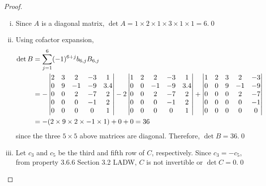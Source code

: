 \begin{proof}
    \renewcommand{\qedsymbol}{$\blacksquare$}

    \begin{enumerate}[(i)]
        \item Since $A$ is a diagonal matrix, $\det A=1\times 2\times 1\times 3\times 1\times 1=6$.\qed
        \item Using cofactor expansion, 
        \[
            \begin{aligned}
                \det B&=\sum_{j=1}^{6}(-1)^{6+j}b_{6,j}B_{6,j}\\
                &=-\begin{vmatrix}
                    2 & 3 & 2 & -3 & 1\\
                    0 & 9 & -1 & -9 & 3.4\\
                    0 & 0 & 2 & -7 & 2\\
                    0 & 0 & 0 & -1 & 2\\
                    0 & 0 & 0 & 0 & 1 
                \end{vmatrix}
                -2\begin{vmatrix}
                    1 & 2 & 2 & -3 & 1\\
                    0 & 0 & -1 & -9 & 3.4\\
                    0 & 0 & 2 & -7 & 2\\
                    0 & 0 & 0 & -1 & 2\\
                    0 & 0 & 0 & 0 & 1
                \end{vmatrix}
                +\begin{vmatrix}
                    1 & 2 & 3 & 2 & -3\\
                    0 & 0 & 9 & -1 & -9\\
                    0 & 0 & 0 & 2 & -7\\
                    0 & 0 & 0 & 0 & -1\\
                    0 & 0 & 0 & 0 & 0
                \end{vmatrix}\\
                &= -(2\times 9\times 2\times -1\times 1)+0+0=36
            \end{aligned}\\
        \]
        since the three $5\times 5$ above matrices are diagonal.
        Therefore, $\det B=36$.\qed
        \item Let $c_3$ and $c_5$ be the third and fifth row of $C$, respectively.
        Since $c_3=-c_5$, from property 3.6.6 Section 3.2 LADW, $C$ is not invertible or $\det C=0$.\qed
   \end{enumerate}
   
   \renewcommand{\qedsymbol}{}
\end{proof}
